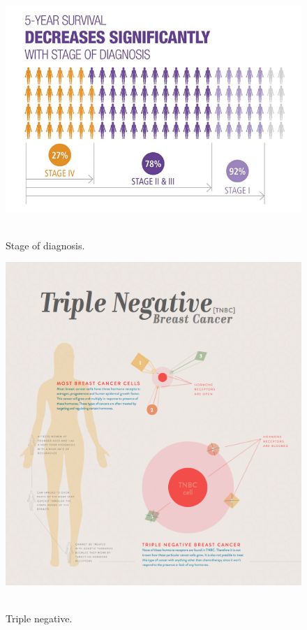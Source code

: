 \begin{figure}[!hbt]
\centering
\includegraphics[width=15cm]{images/life-expectancy}~\\
\caption{\label{fig:screenshot}Stage of diagnosis.
}
\end{figure}

\begin{figure}[!hbt]
\centering
\includegraphics[width=15cm]{images/pm}~\\
\caption{\label{fig:screenshot}Triple negative.
}
\end{figure}